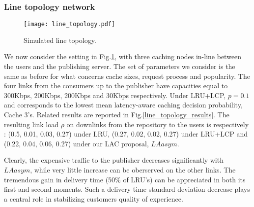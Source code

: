 \documentclass[conference]{IEEEtran}
\begin{document}
\subsubsection{Line topology network}
\begin{figure}[htbp] 
\centering
\texttt{[image: line\_topology.pdf]}
\vspace{-1cm}
\caption{Simulated line topology.} 
\label{fig:line_topology} 
\end{figure}
We now consider the setting in Fig.\ref{fig:line_topology}, with three caching nodes in-line
between the users and the publishing server. 
The set of parameters we consider is the same as before for what concerns cache sizes, request process and popularity. 
The four links from the consumers up to the
publisher have capacities equal to 300Kbps, 200Kbps, 200Kbps and 30Kbps respectively. 
Under LRU+LCP,  $p = 0.1$ and corresponds to the lowest mean latency-aware caching decision probability, Cache 3's. 
Related results are reported in Fig.\ref{line_topology_results}.
The resulting link load $\rho$ on downlinks from the repository to the users is respectively : (0.5, 0.01, 0.03, 0.27) under LRU,
(0.27, 0.02, 0.02, 0.27) under LRU+LCP and (0.22, 0.04, 0.06, 0.27) under our LAC proposal, $LAasym$. 
\begin{figure*}[ht] 
\centering
{}
\caption{Line topology simulation: LAasym decreases  LRU delivery time by 50\% and outperforms LRU+LCP on convergence.}
\label{line_topology_results}
\end{figure*} 
Clearly, the expensive traffic to the publisher decreases significantly with $LAasym$, while very little increase can be oberserved on the other links. The tremendous gain in delivery time (50\% of LRU's) can be appreciated in both its first and second moments. Such a delivery time standard deviation decrease plays a central role in stabilizing customers quality of experience.
\end{document}
